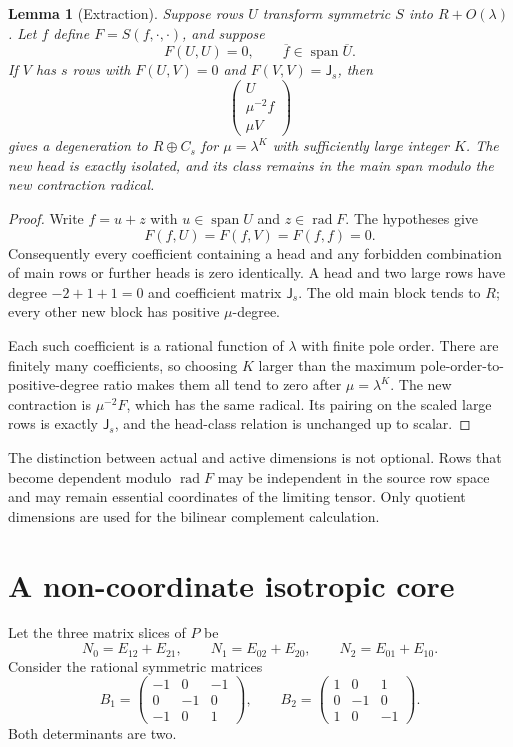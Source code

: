 \documentclass[11pt]{article}
\newtheorem{lemma}[theorem]{Lemma}
\theoremstyle{definition}\newtheorem{definition}[theorem]{Definition}
\theoremstyle{remark}\newtheorem{remark}[theorem]{Remark}
\newcommand{\rad}{\operatorname{rad}}
\newcommand{\Span}{\operatorname{span}}
\newcommand{\J}{\mathsf J}
\begin{document}
\begin{lemma}[Extraction]\label{lem:extraction}
Suppose rows $U$ transform symmetric $S$ into $R+O(\lambda)$. Let $f$ define $F=S(f,\cdot,\cdot)$, and suppose
\[
 F(U,U)=0,\qquad \overline f\in\Span\overline U.
\]
If $V$ has $s$ rows with $F(U,V)=0$ and $F(V,V)=\J_s$, then
\[
 \begin{pmatrix}U\\\mu^{-2}f\\\mu V\end{pmatrix}
\]
gives a degeneration to $R\oplus C_s$ for $\mu=\lambda^K$ with sufficiently large integer $K$. The new head is exactly isolated, and its class remains in the main span modulo the new contraction radical.
\end{lemma}
\begin{proof}
Write $f=u+z$ with $u\in\Span U$ and $z\in\rad F$. The hypotheses give
\[
 F(f,U)=F(f,V)=F(f,f)=0.
\]
Consequently every coefficient containing a head and any forbidden combination of main rows or further heads is zero identically. A head and two large rows have degree $-2+1+1=0$ and coefficient matrix $\J_s$. The old main block tends to $R$; every other new block has positive $\mu$-degree.

Each such coefficient is a rational function of $\lambda$ with finite pole order. There are finitely many coefficients, so choosing $K$ larger than the maximum pole-order-to-positive-degree ratio makes them all tend to zero after $\mu=\lambda^K$. The new contraction is $\mu^{-2}F$, which has the same radical. Its pairing on the scaled large rows is exactly $\J_s$, and the head-class relation is unchanged up to scalar.
\end{proof}

The distinction between actual and active dimensions is not optional. Rows that become dependent modulo $\rad F$ may be independent in the source row space and may remain essential coordinates of the limiting tensor. Only quotient dimensions are used for the bilinear complement calculation.

\section{A non-coordinate isotropic core}\label{sec:core}

Let the three matrix slices of $P$ be
\[
 N_0=E_{12}+E_{21},\qquad N_1=E_{02}+E_{20},\qquad N_2=E_{01}+E_{10}.
\]
Consider the rational symmetric matrices
\begin{equation}\label{eq:core-forms}
 B_1=\begin{pmatrix}-1&0&-1\\0&-1&0\\-1&0&1\end{pmatrix},\qquad
 B_2=\begin{pmatrix}1&0&1\\0&-1&0\\1&0&-1\end{pmatrix}.
\end{equation}
Both determinants are two.
\end{document}

